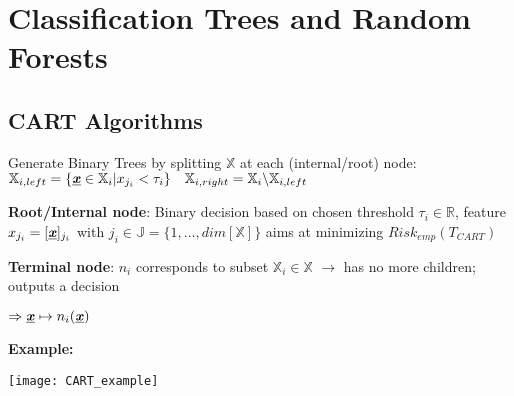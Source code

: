 \section{Classification Trees and Random Forests}

\begin{sectionbox}
	\subsection{CART Algorithms}
	Generate Binary Trees by splitting $\mathbb X$ at each (internal/root) node: $\mathbb{X}_{i,left}=\{\underline{\textbf{\textit{x}}}\in\mathbb{X}_i|x_{j_i}<\tau_i\}\quad\mathbb{X}_{i,right}=\mathbb{X}_i\backslash\mathbb{X}_{i,left}$
	
	\textbf{Root/Internal node}: Binary decision based on chosen threshold $\tau_i\in\mathbb{R}$, feature $x_{j_i}=[\underline{\textbf{\textit{x}}}]_{j_i}$ with $j_i\in\mathbb{J}=\{1,...,dim[\mathbb{X}]\}$ aims at minimizing $Risk_{emp}(T_{CART})$
	
	\textbf{Terminal node}: $n_i$ corresponds to subset $\mathbb{X}_i\in\mathbb{X}$ $\rightarrow$ has no more children; outputs a decision
	
	$\Rightarrow \underline{\textbf{\textit{x}}}\mapsto n_i(\underline{\textbf{\textit{x}}})$  
	
	\textbf{Example:}

	\texttt{[image: CART\_example]}
	
\end{sectionbox}
